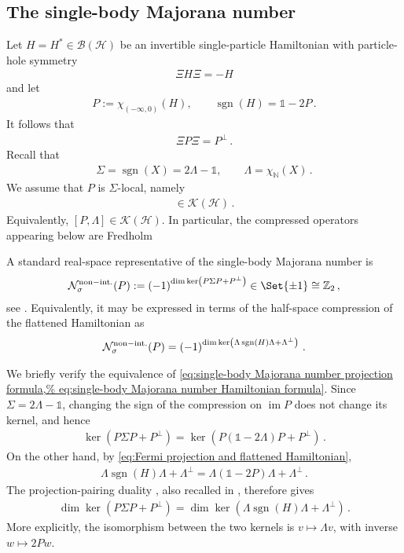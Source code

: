 \documentclass[a4paper,10pt]{article}
\numberwithin{equation}{section}
\theoremstyle{plain}
\theoremstyle{plain}
\theoremstyle{plain}
\theoremstyle{plain}
\theoremstyle{plain}
\theoremstyle{remark}
\theoremstyle{definition}
\newcommand{\ZZ}{\mathbb{Z}}
\newcommand{\NN}{\mathbb{N}}
\newcommand{\calB}{\mathcal{B}}
\newcommand{\calN}{\mathcal{N}}
\newcommand{\calH}{\mathcal{H}}
\newcommand{\calK}{\mathcal{K}}
\newcommand{\Id}{\mathds{1}}
\newcommand{\sgn}{\operatorname{sgn}}
\newcommand{\im}{\operatorname{im}}
\newcommand{\eq}[1]{\begin{align*}#1\end{align*}}
\newcommand{\eql}[1]{\begin{align}#1\end{align}}
\newcommand{\br}[1]{\left(#1\right)}
\begin{document}
\subsection{The single-body Majorana number}
\label{subsec:single-body Majorana number}

Let $H=H^\ast\in\calB(\calH)$ be an invertible single-particle
Hamiltonian with particle-hole symmetry
\eq{
    \Xi H\Xi=-H
}
and let
\eql{\label{eq:Fermi projection and flattened Hamiltonian}
    P
    :=
    \chi_{(-\infty,0)}(H),
    \qquad
    \sgn(H)
    =
    \Id-2P\,.
}
It follows that
\eq{
    \Xi P\Xi=P^\perp\,.
}
Recall that
\eq{
    \Sigma
    =
    \sgn(X)
    =
    2\Lambda-\Id,
    \qquad
    \Lambda
    =
    \chi_{\NN}(X)\,.
}
We assume that $P$ is $\Sigma$-local, namely
\eq{
    [P,\Sigma]\in\calK(\calH)\,.
}
Equivalently, $[P,\Lambda]\in\calK(\calH)$. In particular, the
compressed operators appearing below are Fredholm

A standard real-space representative of the single-body Majorana
number is
\eql{\label{eq:single-body Majorana number projection formula}
    \calN_\sigma^{\rm non-int.}(P)
    :=
    \br{-1}^{\dim\ker\br{P\Sigma P+P^\perp}}
    \in
    \Set{\pm1}
    \cong
    \ZZ_2\, ,
}
see
\cite{GrossmannSchulzBaldes2016,KatsuraKoma2018,ChungShapiro2023}.
Equivalently, it may be expressed in terms of the half-space
compression of the flattened Hamiltonian as
\eql{\label{eq:single-body Majorana number Hamiltonian formula}
    \calN_\sigma^{\rm non-int.}(P)
    =
    \br{-1}^{\dim\ker\br{
        \Lambda\sgn(H)\Lambda+\Lambda^\perp
    }}\,.
}

We briefly verify the equivalence of
\cref{eq:single-body Majorana number projection formula,%
eq:single-body Majorana number Hamiltonian formula}.
Since $\Sigma=2\Lambda-\Id$, changing the sign of the compression on
$\im P$ does not change its kernel, and hence
\eq{
    \ker\br{P\Sigma P+P^\perp}
    =
    \ker\br{P(\Id-2\Lambda)P+P^\perp}\,.
}
On the other hand, by
\cref{eq:Fermi projection and flattened Hamiltonian},
\eq{
    \Lambda\sgn(H)\Lambda+\Lambda^\perp
    =
    \Lambda(\Id-2P)\Lambda+\Lambda^\perp\,.
}
The projection-pairing duality
\cite[Proposition~1]{GrossmannSchulzBaldes2016},
also recalled in
\cite[Proposition~24]{KatsuraKoma2018}, therefore gives
\eql{\label{eq:duality of single-body Majorana kernels}
    \dim\ker\br{P\Sigma P+P^\perp}
    =
    \dim\ker\br{
        \Lambda\sgn(H)\Lambda+\Lambda^\perp
    }\,.
}
More explicitly, the isomorphism between the two kernels is
$v\mapsto\Lambda v$, with inverse $w\mapsto 2Pw$.
\end{document}
